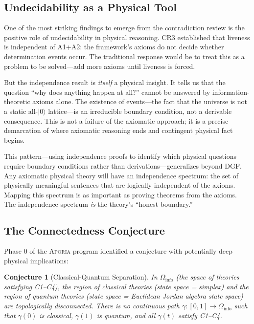 \documentclass[12pt,a4paper]{article}
\newtheorem{conjecture}[theorem]{Conjecture}
\theoremstyle{definition}
\theoremstyle{remark}
\newcommand{\Aporia}{\textsc{Aporia}}
\begin{document}
\subsection{Undecidability as a Physical Tool}

One of the most striking findings to emerge from the contradiction review is the positive role of undecidability in physical reasoning. CR3 established that liveness is independent of A1+A2: the framework's axioms do not decide whether determination events occur. The traditional response would be to treat this as a problem to be solved---add more axioms until liveness is forced.

But the independence result is \emph{itself} a physical insight. It tells us that the question ``why does anything happen at all?'' cannot be answered by information-theoretic axioms alone. The existence of events---the fact that the universe is not a static all-$|0\rangle$ lattice---is an irreducible boundary condition, not a derivable consequence. This is not a failure of the axiomatic approach; it is a precise demarcation of where axiomatic reasoning ends and contingent physical fact begins.

This pattern---using independence proofs to identify which physical questions require boundary conditions rather than derivations---generalizes beyond DGF. Any axiomatic physical theory will have an independence spectrum: the set of physically meaningful sentences that are logically independent of the axioms. Mapping this spectrum is as important as proving theorems from the axioms. The independence spectrum \emph{is} the theory's ``honest boundary.''

\subsection{The Connectedness Conjecture}

Phase 0 of the \Aporia{} program identified a conjecture with potentially deep physical implications:

\begin{conjecture}[Classical-Quantum Separation]
\label{conj:separation}
In $\Omega_{\mathrm{info}}$ (the space of theories satisfying C1--C4), the region of classical theories (state space = simplex) and the region of quantum theories (state space = Euclidean Jordan algebra state space) are topologically disconnected. There is no continuous path $\gamma: [0,1] \to \Omega_{\mathrm{info}}$ such that $\gamma(0)$ is classical, $\gamma(1)$ is quantum, and all $\gamma(t)$ satisfy C1--C4.
\end{conjecture}
\end{document}
